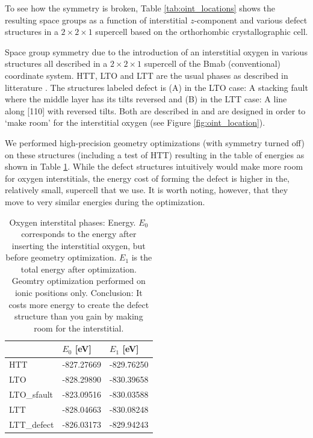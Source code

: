 To see how the symmetry is broken, Table \ref{tab:oint_locations} shows the resulting space groups as a function of interstitial $z$-component and various defect structures in a $2 \times 2 \times 1$ supercell based on the orthorhombic crystallographic cell. 

\begin{table}[b]
    \centering
    
    \caption[Oxygen interstitial phases]{Space group symmetry due to the introduction of an interstitial oxygen in various structures all described in a $2 \times 2 \times 1$ supercell of the Bmab (conventional) coordinate system. HTT, LTO and LTT are the usual phases as described in litterature \cite{Hucker2012}. The structures labeled defect is (A) in the LTO case: A stacking fault where the middle layer has its tilts reversed and (B) in the LTT case: A line along [110] with reversed tilts. Both are described in \cite{Tranquada1994} and are designed in order to `make room' for the interstitial oxygen (see Figure \ref{fig:oint_location}).}
    \label{tab:oint_locations}
\end{table}

We performed high-precision geometry optimizations (with symmetry turned off) on these structures (including a test of HTT) resulting in the table of energies as shown in Table \ref{tab:oint_en}. While the defect structures intuitively would make more room for oxygen interstitials, the energy cost of forming the defect is higher in the, relatively small, supercell that we use. It is worth noting, however, that they move to very similar energies during the optimization.


\begin{table}[b]
    \centering
    \begin{tabular}{@{}lll@{}}
    \toprule
     & $E_0$ [eV] & $E_1$ [eV]            \\ \midrule
    HTT                     & -827.27669             & -829.76250 \\
    LTO                     & -828.29890             & -830.39658 \\
    LTO\_sfault              & -823.09516             & -830.03588 \\
    LTT                     & -828.04663             & -830.08248 \\
    LTT\_defect              & -826.03173             & -829.94243 \\ \bottomrule
    \end{tabular}
    \caption[Oxygen interstital phases: Energy]{Oxygen interstital phases: Energy. $E_0$ corresponds to the energy after inserting the interstitial oxygen, but before geometry optimization. $E_1$ is the total energy after optimization. Geomtry optimization performed on ionic positions only. Conclusion: It costs more energy to create the defect structure than you gain by making room for the interstitial.}
    \label{tab:oint_en}
\end{table}